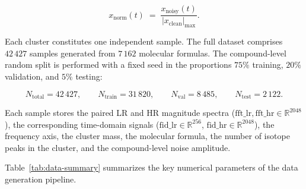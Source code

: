 \documentclass[12pt,a4paper]{report}
\begin{document}
\begin{equation}
  x_{\mathrm{norm}}(t) \;=\; \frac{x_{\mathrm{noisy}}(t)}
  {|x_{\mathrm{clean}}|_{\max}}.
  \label{eq:normalization}
\end{equation}

Each cluster constitutes one independent sample.  The full dataset comprises
$42\,427$ samples generated from $7\,162$ molecular formulas.  The compound-level random split is
performed with a fixed seed in the proportions $75\%$ training, $20\%$
validation, and $5\%$ testing:

\begin{equation}
  N_{\mathrm{total}} = 42\,427,
  \qquad
  N_{\mathrm{train}} = 31\,820,
  \qquad
  N_{\mathrm{val}}   = 8\,485,
  \qquad
  N_{\mathrm{test}}  = 2\,122.
\end{equation}

Each sample stores the paired LR and HR magnitude spectra
($\text{fft\_lr}, \text{fft\_hr} \in \mathbb{R}^{2048}$), the corresponding
time-domain signals ($\text{fid\_lr} \in \mathbb{R}^{256}$,
$\text{fid\_hr} \in \mathbb{R}^{2048}$), the frequency axis, the cluster mass,
the molecular formula, the number of isotope peaks in the cluster, and the
compound-level noise amplitude.

\bigskip
Table~\ref{tab:data-summary} summarizes the key numerical parameters of the
data generation pipeline.
\end{document}
